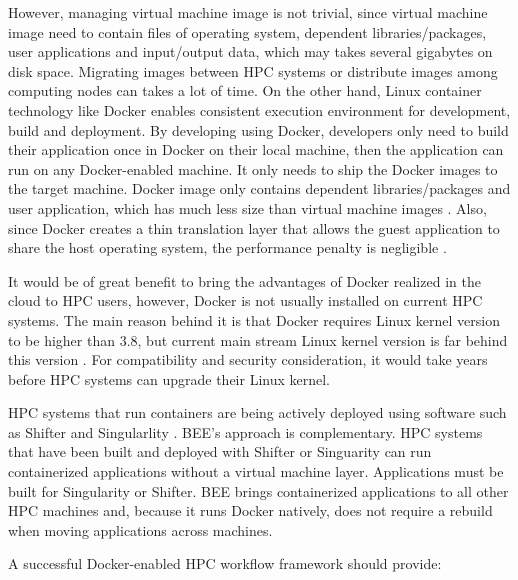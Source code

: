 However, managing virtual machine image is not trivial, since virtual machine image need to contain files of operating system, dependent libraries/packages, user applications and input/output data, which may takes several gigabytes on disk space. Migrating images between HPC systems or distribute images among computing nodes can takes a lot of time. On the other hand, Linux container technology like Docker \cite{Docker} \cite{awscontainer} enables consistent execution environment for development, build and deployment. By developing using Docker, developers only need to build their application once in Docker on their local machine, then the application can run on any Docker-enabled machine. It only needs to ship the Docker images to the target machine. Docker image only contains dependent libraries/packages and user application, which has much less size than virtual machine images \cite{boettiger2015introduction}. Also, since Docker creates a thin translation layer that allows the guest application to share the host operating system, the performance penalty is negligible \cite{merkel2014docker}.

It would be of great benefit to bring the advantages of Docker realized in the cloud to HPC users, however, Docker is not usually installed on current HPC systems. The main reason behind it is that Docker requires Linux kernel version to be higher than 3.8, but current main stream Linux kernel version is far behind this version \cite{harji2013our}. For compatibility and security consideration, it would take years before HPC systems can upgrade their Linux kernel. 

HPC systems that run containers are being actively deployed using software such as Shifter \cite{jacobsen2015contain} and Singularlity \cite{kurtzer_2016_60736}. BEE's approach is complementary.  HPC systems that have been built and deployed with Shifter or Singuarity can run containerized applications without a virtual machine layer.  Applications must be built for Singularity or Shifter.  BEE brings containerized applications to all other HPC machines and, because it runs Docker natively, does not require a rebuild when moving applications across machines.


A successful Docker-enabled HPC workflow framework should provide:

